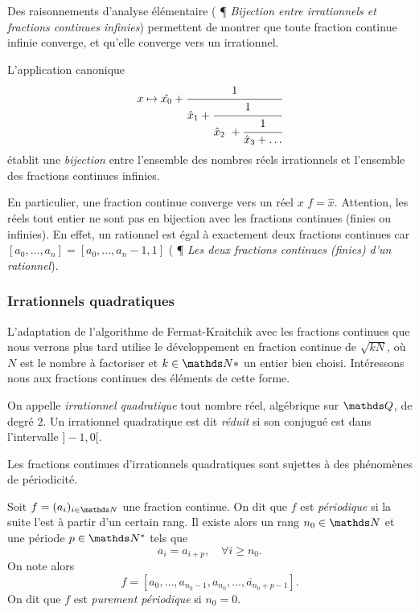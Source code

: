 Des raisonnements d'analyse élémentaire (\cite{wikiu} ¶ \emph{Bijection entre
irrationnels et fractions continues infinies}) permettent de montrer que toute
fraction continue infinie converge, et qu'elle converge vers un irrationnel.

\begin{theoreme}
	L'application canonique \[x \mapsto \hat{x_0} + \cfrac{1}{\hat{x}_1 +
	\cfrac{1}{\hat{x}_2 + \cfrac{1}{\hat{x}_3 + \dots}}}\] établit une
	\emph{bijection} entre l'ensemble des nombres réels irrationnels et
	l'ensemble des fractions continues infinies.
\end{theoreme}

En particulier, une fraction continue converge vers un réel $x$ \ssi
$f=\hat{x}$. Attention, les réels tout entier ne sont pas en bijection avec les
fractions continues (finies ou infinies). En effet, un rationnel est égal à
exactement deux fractions continues car $[a_0, \dots, a_n] = [a_0, \dots, a_n -
1, 1]$ (\cite{wikiu} ¶ \emph{Les deux fractions continues (finies) d'un
rationnel}).

\subsubsection{Irrationnels quadratiques}
\label{ss-irrquad}

L'adaptation de l'algorithme de Fermat-Kraitchik avec les fractions continues
que nous verrons plus tard utilise le développement en fraction continue de
$\sqrt{kN}$, où $N$ est le nombre à factoriser et $k\in \N*$ un entier bien
choisi. Intéressons nous aux fractions continues des éléments de cette forme.

\begin{definition}
	On appelle \emph{irrationnel quadratique} tout nombre réel, algébrique sur
	$\Q$, de degré $2$. Un irrationnel quadratique est dit \emph{réduit} si son
	conjugué est dans l'intervalle $]-1, 0[$.
\end{definition}

Les fractions continues d'irrationnels quadratiques sont sujettes à des
phénomènes de périodicité.

\begin{definition}
	Soit $f = (a_i)_{i\in \N}$ une fraction continue. On dit que $f$ est
	\emph{périodique} si la suite l'est à partir d'un certain rang. Il existe
	alors un rang $n_0\in \N$ et une période $p\in \N^*$ tels que \[a_{i} =
	a_{i+p}, \quad \forall i\geq n_0.\] On note alors \[f = [a_0, \dots, a_{n_0
	- 1}, \overline{a_{n_0}, \dots, a_{n_0 + p -1}}].\] On dit que $f$ est
	\emph{purement périodique} si $n_0 = 0$.
\end{definition}

